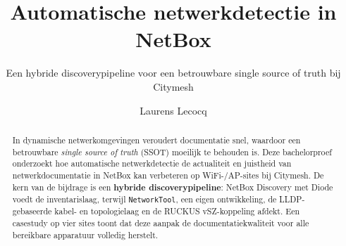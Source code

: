\documentclass[a0,portrait]{hogent-poster}
\title{Automatische netwerkdetectie in NetBox}
\subtitle{Een hybride discoverypipeline voor een betrouwbare single source of truth bij Citymesh}
\author{Laurens Lecocq}
\begin{document}
\maketitle

\begin{abstract}
In dynamische netwerkomgevingen veroudert documentatie snel, waardoor een betrouwbare \emph{single source of truth} (SSOT) moeilijk te behouden is. Deze bachelorproef onderzoekt hoe automatische netwerkdetectie de actualiteit en juistheid van netwerkdocumentatie in NetBox kan verbeteren op WiFi-/AP-sites bij Citymesh. De kern van de bijdrage is een \textbf{hybride discoverypipeline}: NetBox Discovery met Diode voedt de inventarislaag, terwijl \texttt{NetworkTool}, een eigen ontwikkeling, de LLDP-gebaseerde kabel- en topologielaag en de RUCKUS vSZ-koppeling afdekt. Een casestudy op vier sites toont dat deze aanpak de documentatiekwaliteit voor alle bereikbare apparatuur volledig herstelt.
\end{abstract}
\end{document}
